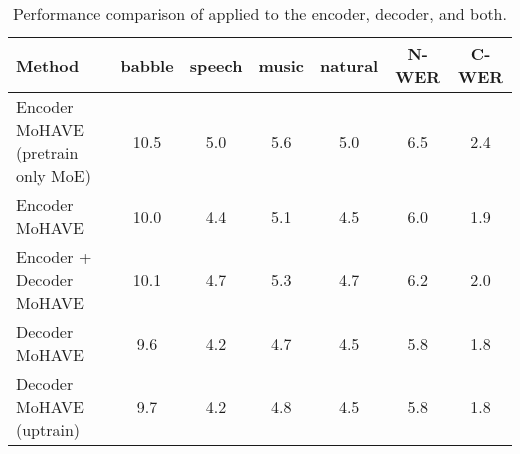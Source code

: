 \begin{table}[!h]
    \centering
    \small
    \caption{Performance comparison of \ourmodel applied to the encoder, decoder, and both.}
    \label{tab:encoder_mohave}
    \vspace{5pt}
    \begin{tabular}{l|cccc|c|c}
        \toprule
        Method & babble & speech & music & natural & N-WER & C-WER \\
        \midrule
        Encoder MoHAVE (pretrain only MoE) & 10.5 & 5.0 & 5.6 & 5.0 & 6.5 & 2.4 \\
        Encoder MoHAVE & 10.0 & 4.4 & 5.1 & 4.5 & 6.0 & 1.9 \\
        Encoder + Decoder MoHAVE & 10.1 & 4.7 & 5.3 & 4.7 & 6.2 & 2.0 \\
        \midrule
        Decoder MoHAVE & 9.6 & 4.2 & 4.7 & 4.5 & 5.8 & 1.8 \\
        Decoder MoHAVE (uptrain) & 9.7 & 4.2 & 4.8 & 4.5 & 5.8 & 1.8 \\        
        \bottomrule
    \end{tabular}
\end{table}